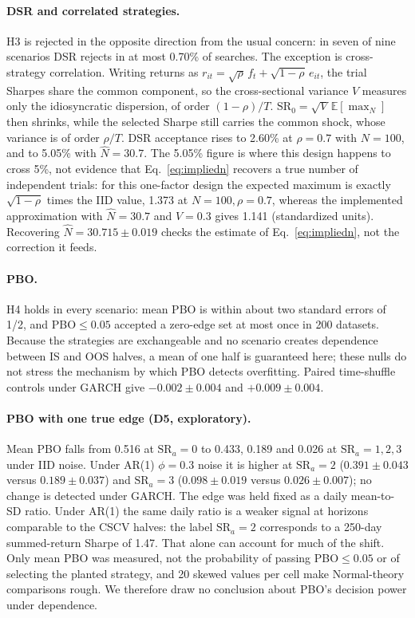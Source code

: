 \documentclass[11pt,a4paper]{article}
\newcommand{\SR}{\mathrm{SR}}
\newcommand{\E}{\mathbb{E}}
\theoremstyle{remark}
\begin{document}
\paragraph{DSR and correlated strategies.} H3 is rejected in the opposite direction from the usual concern: in seven of nine scenarios DSR rejects in at most 0.70\% of searches. The exception is cross-strategy correlation. Writing returns as $r_{it}=\sqrt{\rho}\,f_t+\sqrt{1-\rho}\,e_{it}$, the trial Sharpes share the common component, so the cross-sectional variance $V$ measures only the idiosyncratic dispersion, of order $(1-\rho)/T$. $\SR_0=\sqrt V\,\E[\max_N]$ then shrinks, while the selected Sharpe still carries the common shock, whose variance is of order $\rho/T$. DSR acceptance rises to 2.60\% at $\rho=0.7$ with $N=100$, and to 5.05\% with $\hat N=30.7$. The 5.05\% figure is where this design happens to cross 5\%, not evidence that Eq.~\eqref{eq:impliedn} recovers a true number of independent trials: for this one-factor design the expected maximum is exactly $\sqrt{1-\rho}$ times the IID value, 1.373 at $N=100,\rho=0.7$, whereas the implemented approximation with $\hat N=30.7$ and $V=0.3$ gives 1.141 (standardized units). Recovering $\hat N=30.715\pm0.019$ checks the estimate of Eq.~\eqref{eq:impliedn}, not the correction it feeds.

\paragraph{PBO.} H4 holds in every scenario: mean PBO is within about two standard errors of 1/2, and PBO$\le0.05$ accepted a zero-edge set at most once in 200 datasets. Because the strategies are exchangeable and no scenario creates dependence between IS and OOS halves, a mean of one half is guaranteed here; these nulls do not stress the mechanism by which PBO detects overfitting. Paired time-shuffle controls under GARCH give $-0.002\pm0.004$ and $+0.009\pm0.004$.

\paragraph{PBO with one true edge (D5, exploratory).} Mean PBO falls from 0.516 at $\SR_a=0$ to 0.433, 0.189 and 0.026 at $\SR_a=1,2,3$ under IID noise. Under AR(1) $\phi=0.3$ noise it is higher at $\SR_a=2$ ($0.391\pm0.043$ versus $0.189\pm0.037$) and $\SR_a=3$ ($0.098\pm0.019$ versus $0.026\pm0.007$); no change is detected under GARCH. The edge was held fixed as a daily mean-to-SD ratio. Under AR(1) the same daily ratio is a weaker signal at horizons comparable to the CSCV halves: the label $\SR_a=2$ corresponds to a 250-day summed-return Sharpe of 1.47. That alone can account for much of the shift. Only mean PBO was measured, not the probability of passing PBO$\le0.05$ or of selecting the planted strategy, and 20 skewed values per cell make Normal-theory comparisons rough. We therefore draw no conclusion about PBO's decision power under dependence.
\end{document}
